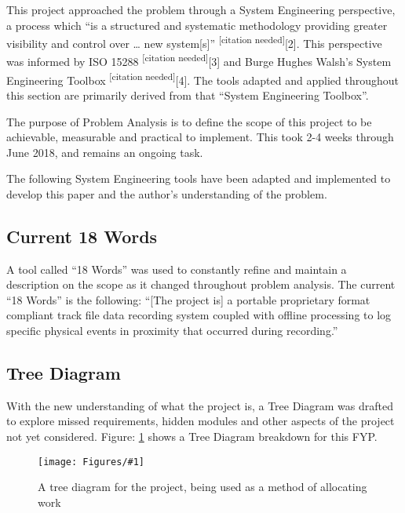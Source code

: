 \documentclass{UoNMCHA}
\newcommand{\citationneeded}{\textsuperscript{\color{blue} [citation needed]}}
\newcommand{\inlineQuote}[1]{``#1''}
\newcommand{\fref}[1] {Figure: \ref{#1}}
\newcommand{\fFigure}[3]{
	\begin{figure}[h]
        \begin{center}  
            \texttt{[image: Figures/\#1]}  
            \caption{#2}
            \label{#1}
        \end{center}
	\end{figure}
}
\numberwithin{equation}{section}
\begin{document}
This project approached the problem through a System Engineering perspective, a process which “is a structured and systematic methodology providing greater visibility and control over … new system[s]” \citationneeded [2]. This perspective was informed by ISO 15288 \citationneeded [3] and Burge Hughes Walsh’s System Engineering Toolbox \citationneeded [4]. The tools adapted and applied throughout this section are primarily derived from that \inlineQuote{System Engineering Toolbox}. 

The purpose of Problem Analysis is to define the scope of this project to be achievable, measurable and practical to implement. This took 2-4 weeks through June 2018, and remains an ongoing task. 

The following System Engineering tools have been adapted and implemented to develop this paper and the author’s understanding of the problem. 

\subsection{Current 18 Words}
A tool called \inlineQuote{18 Words} was used to constantly refine and maintain a description on the scope as it changed throughout problem analysis. The current “18 Words” is the following:
“[The project is] a portable proprietary format compliant track file data recording system coupled with offline processing to log specific physical events in proximity that occurred during recording.” 

\subsection{Tree Diagram}
With the new understanding of what the project is, a Tree Diagram was drafted to explore missed requirements, hidden modules and other aspects of the project not yet considered. \fref{treeDiagram.png} shows a Tree Diagram breakdown for this FYP.

 \fFigure{treeDiagram.png}{A tree diagram for the project, being used as a method of allocating work}{0.7}
\end{document}
